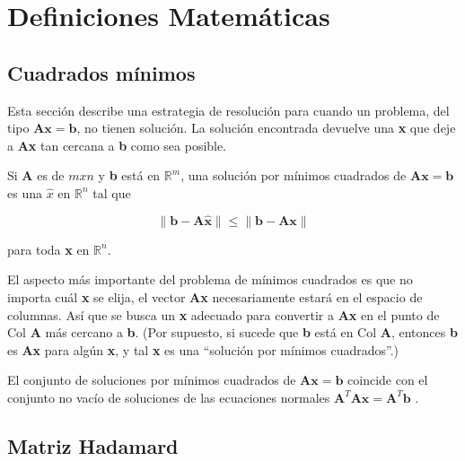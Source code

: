 
\chapter{Definiciones Matemáticas} %

\label{AppendixB} %



\section{Cuadrados mínimos} \label{sec:meanSquare}

Esta sección describe una estrategia de resolución para cuando un problema, del tipo $\mathbf{Ax} = \mathbf{b}$, no tienen solución. 
La solución encontrada devuelve una \textbf{x} que deje a \textbf{Ax} tan cercana a \textbf{b} como sea posible.  

Si \textbf{A} es de $m x n$ y \textbf{b} está en $\mathds{R}^m$, una solución por mínimos cuadrados de $\mathbf{Ax} = \mathbf{b}$
es una $\hat{x}$ en $\mathds{R}^n$ tal que

$$
\parallel \mathbf{b} - \mathbf{A\hat{x}}\parallel \le \parallel\mathbf{b}-\mathbf{Ax} \parallel
$$

para toda \textbf{x} en $\mathds{R}^n$.

El aspecto más importante del problema de mínimos cuadrados es que no importa cuál \textbf{x} se elija, el vector \textbf{Ax}
necesariamente estará en el espacio de columnas. Así que se busca un \textbf{x} adecuado para convertir a \textbf{Ax} en el 
punto de Col \textbf{A} más cercano a \textbf{b}. (Por supuesto, si sucede que \textbf{b} está en Col \textbf{A}, entonces 
\textbf{b} es \textbf{Ax} para algún \textbf{x}, y tal \textbf{x} es una “solución por mínimos cuadrados”.)

El conjunto de soluciones por mínimos cuadrados de $\mathbf{Ax} = \mathbf{b}$ coincide con el conjunto no vacío de soluciones
de las ecuaciones normales $\mathbf{A}^T\mathbf{Ax} = \mathbf{A}^T\mathbf{b}$ \cite{MatrixMin}.


\section{Matriz Hadamard}

